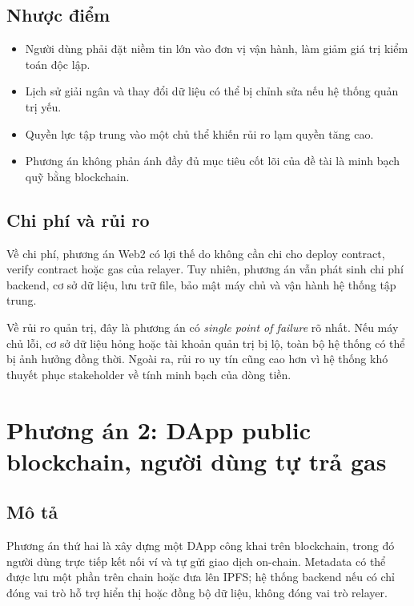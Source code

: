 \subsection{Nhược điểm}

\begin{itemize}
  \item Người dùng phải đặt niềm tin lớn vào đơn vị vận hành, làm giảm giá trị kiểm toán độc lập.
  \item Lịch sử giải ngân và thay đổi dữ liệu có thể bị chỉnh sửa nếu hệ thống quản trị yếu.
  \item Quyền lực tập trung vào một chủ thể khiến rủi ro lạm quyền tăng cao.
  \item Phương án không phản ánh đầy đủ mục tiêu cốt lõi của đề tài là minh bạch quỹ bằng blockchain.
\end{itemize}

\subsection{Chi phí và rủi ro}

Về chi phí, phương án Web2 có lợi thế do không cần chi cho deploy contract, verify contract hoặc gas của relayer. Tuy nhiên, phương án vẫn phát sinh chi phí backend, cơ sở dữ liệu, lưu trữ file, bảo mật máy chủ và vận hành hệ thống tập trung.

Về rủi ro quản trị, đây là phương án có \textit{single point of failure} rõ nhất. Nếu máy chủ lỗi, cơ sở dữ liệu hỏng hoặc tài khoản quản trị bị lộ, toàn bộ hệ thống có thể bị ảnh hưởng đồng thời. Ngoài ra, rủi ro uy tín cũng cao hơn vì hệ thống khó thuyết phục stakeholder về tính minh bạch của dòng tiền.

\section{Phương án 2: DApp public blockchain, người dùng tự trả gas}

\subsection{Mô tả}

Phương án thứ hai là xây dựng một DApp công khai trên blockchain, trong đó người dùng trực tiếp kết nối ví và tự gửi giao dịch on-chain. Metadata có thể được lưu một phần trên chain hoặc đưa lên IPFS; hệ thống backend nếu có chỉ đóng vai trò hỗ trợ hiển thị hoặc đồng bộ dữ liệu, không đóng vai trò relayer.

